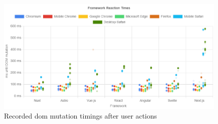 \documentclass[a4paper, 12pt]{article}
\begin{document}
\begin{figure}[ht]
  \centering
  \includegraphics[width=\linewidth, keepaspectratio]{img/playwright-results/userActions_byUserAction/total.png}
  \caption{Recorded \acrshort{dom} mutation timings after user actions}
  \label{fig:playwrightResults:total}
\end{figure}
\end{document}
